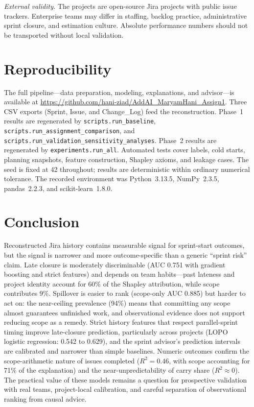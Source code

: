 \documentclass[conference]{IEEEtran}
\begin{document}
\textit{External validity.}
The projects are open-source Jira projects with public issue trackers.
Enterprise teams may differ in staffing, backlog practice, administrative sprint closure, and estimation culture.
Absolute performance numbers should not be transported without local validation.

\balance
\section{Reproducibility}

The full pipeline---data preparation, modeling, explanations, and advisor---is available at \url{https://github.com/hani-ziad/AddAI_MaryamHani_Assign1}.
Three CSV exports (Sprint, Issue, and Change\_Log) feed the reconstruction.
Phase~1 results are regenerated by \texttt{scripts.run\_baseline}, \texttt{scripts.run\_assignment\_comparison}, and \texttt{scripts.run\_validation\_sensitivity\_analyses}.
Phase~2 results are regenerated by \texttt{experiments.run\_all}.
Automated tests cover labels, cold starts, planning snapshots, feature construction, Shapley axioms, and leakage cases.
The seed is fixed at 42 throughout; results are deterministic within ordinary numerical tolerance.
The recorded environment was Python~3.13.5, NumPy~2.3.5, pandas~2.2.3, and scikit-learn~1.8.0.

\section{Conclusion}

Reconstructed Jira history contains measurable signal for sprint-start outcomes, but the signal is narrower and more outcome-specific than a generic ``sprint risk'' claim.
Late closure is moderately discriminable (AUC 0.751 with gradient boosting and strict features) and depends on team habits---past lateness and project identity account for 60\% of the Shapley attribution, while scope contributes 9\%.
Spillover is easier to rank (scope-only AUC 0.885) but harder to act on: the near-ceiling prevalence (94\%) means that committing any scope almost guarantees unfinished work, and observational evidence does not support reducing scope as a remedy.
Strict history features that respect parallel-sprint timing improve late-closure prediction, particularly across projects (LOPO logistic regression: 0.542 to 0.629), and the sprint advisor's prediction intervals are calibrated and narrower than simple baselines.
Numeric outcomes confirm the scope-arithmetic nature of issues completed ($R^2 = 0.46$, with scope accounting for 71\% of the explanation) and the near-unpredictability of carry share ($R^2 \approx 0$).
The practical value of these models remains a question for prospective validation with real teams, project-local calibration, and careful separation of observational ranking from causal advice.
\end{document}
